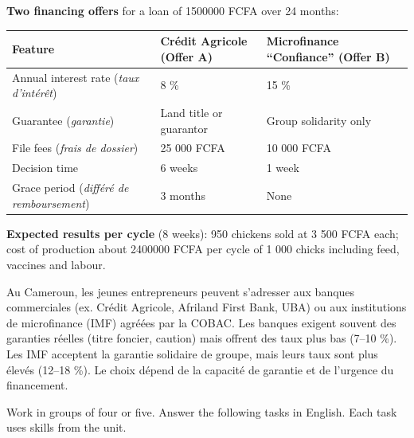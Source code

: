 \documentclass[11pt]{article}
\newcounter{popsec}
\newcounter{popsub}
\newcommand{\courssub}[1]{%
  \stepcounter{popsub}%
  \par\vspace{9pt}\noindent{\popxbold\fontsize{11.5}{13}\selectfont\color{popink}{\color{poporange}\thepopsec.\thepopsub}\hspace{6pt}#1}\par\nopagebreak\vspace{4pt}
}
\begin{document}
\textbf{Two financing offers} for a loan of \num{1500000} FCFA over 24 months:

\begin{center}
\begin{tabularx}{\linewidth}{|l|X|X|}\hline
\rowcolor{popblueL} \textbf{Feature} & \textbf{Crédit Agricole (Offer A)} & \textbf{Microfinance ``Confiance'' (Offer B)} \\ \hline
Annual interest rate (\emph{taux d'intérêt}) & 8 \% & 15 \% \\ \hline
Guarantee (\emph{garantie}) & Land title or guarantor & Group solidarity only \\ \hline
File fees (\emph{frais de dossier}) & 25 000 FCFA & 10 000 FCFA \\ \hline
Decision time & 6 weeks & 1 week \\ \hline
Grace period (\emph{différé de remboursement}) & 3 months & None \\ \hline
\end{tabularx}
\end{center}

\textbf{Expected results per cycle} (8 weeks): 950 chickens sold at 3 500 FCFA each; cost of production about \num{2400000} FCFA per cycle of 1 000 chicks including feed, vaccines and labour.

\begin{savaistu}
Au Cameroun, les jeunes entrepreneurs peuvent s'adresser aux banques commerciales (ex. Crédit Agricole, Afriland First Bank, UBA) ou aux institutions de microfinance (IMF) agréées par la COBAC. Les banques exigent souvent des garanties réelles (titre foncier, caution) mais offrent des taux plus bas (7--10 \%). Les IMF acceptent la garantie solidaire de groupe, mais leurs taux sont plus élevés (12--18 \%). Le choix dépend de la capacité de garantie et de l'urgence du financement.
\end{savaistu}

\courssub{Consignes}

Work in groups of four or five. Answer the following tasks in English. Each task uses skills from the unit.
\end{document}
